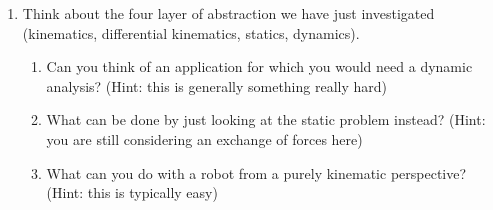 \begin{enumerate}
\item Think about the four layer of abstraction we have just investigated (kinematics, differential kinematics, statics, dynamics).
\begin{enumerate}
\item Can you think of an application for which you would need a dynamic analysis? (Hint: this is generally something really hard)
\item What can be done by just looking at the static problem instead? (Hint: you are still considering an exchange of forces here)
\item What can you do with a robot from a purely kinematic perspective? (Hint: this is typically easy)
\end{enumerate}
\end{enumerate}
